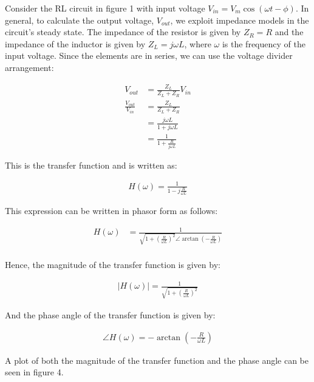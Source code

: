 \documentclass{article}
\begin{document}
\begin{description}
Consider the RL circuit in figure 1 with input voltage $V_{in} = V_m \cos(\omega t - \phi)$. In general, to calculate the output voltage, $V_{out}$, we exploit impedance models in the circuit's steady state. The impedance of the resistor is given by $Z_R = R$ and the impedance of the inductor is given by $Z_L = j \omega L$, where $\omega$ is the frequency of the input voltage. Since the elements are in series, we can use the voltage divider arrangement:

\begin{align*}
V_{out} &= \frac{Z_L}{Z_L + Z_R} V_{in} \\
\frac{V_{out}}{V_{in}} &= \frac{Z_L}{Z_L + Z_R} \\
& = \frac{j \omega L}{1 + j \omega L} \\
& = \frac{1}{1 + \frac{R}{j \omega L}}
\end{align*}

This is the transfer function and is written as:

\begin{align}
H(\omega) = \frac{1}{1 - j \frac{R}{\omega L}}
\end{align}

This expression can be written in phasor form as follows:

\begin{align*}
H(\omega) &= \frac{1}{\sqrt{1 + (\frac{R}{\omega L})^2} \angle \arctan(-\frac{R}{\omega L})} \\
\end{align*}

Hence, the magnitude of the transfer function is given by:

\begin{align}
|H(\omega)| = \frac{1}{\sqrt{1 + (\frac{R}{\omega L})^2}}
\end{align}

And the phase angle of the transfer function is given by:

\begin{align}
\angle H(\omega) = - \arctan (-\frac{R}{\omega L})
\end{align}

A plot of both the magnitude of the transfer function and the phase angle can be seen in figure 4.


\end{description}
\end{document}
